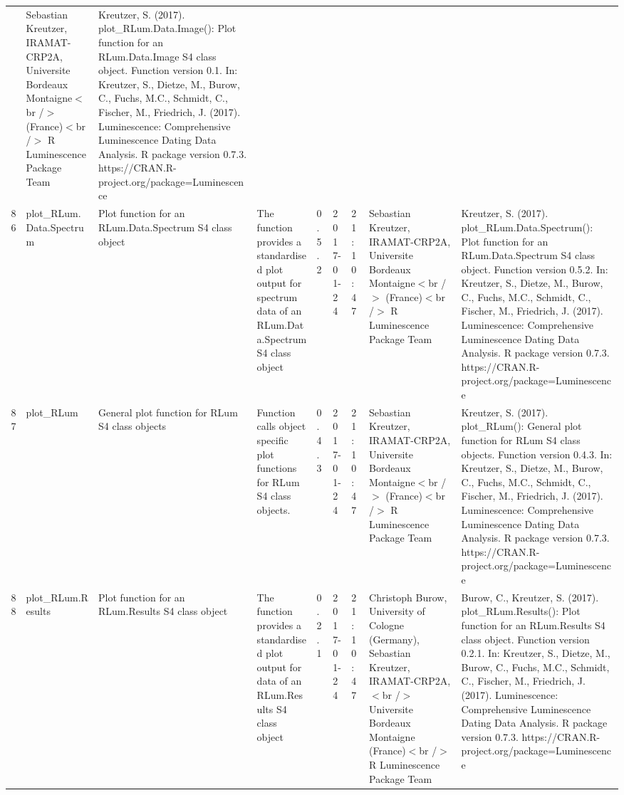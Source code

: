 \begin{table}[ht]
\begin{tabular}{rllllllll}
 & Sebastian Kreutzer, IRAMAT-CRP2A, Universite Bordeaux Montaigne$<$br /$>$ (France)$<$br /$>$  R Luminescence Package Team & Kreutzer, S. (2017). plot\_RLum.Data.Image(): Plot function for an RLum.Data.Image S4 class object. Function version 0.1. In: Kreutzer, S., Dietze, M., Burow, C., Fuchs, M.C., Schmidt, C., Fischer, M., Friedrich, J. (2017). Luminescence: Comprehensive Luminescence Dating Data Analysis. R package version 0.7.3. https://CRAN.R-project.org/package=Luminescence
 \\ 
  86 & plot\_RLum.Data.Spectrum & Plot function for an RLum.Data.Spectrum S4 class object & The function provides a standardised plot output for spectrum data of an RLum.Data.Spectrum S4 class object & 0.5.2 & 2017-01-24 & 21:10:47
 & Sebastian Kreutzer, IRAMAT-CRP2A, Universite Bordeaux Montaigne$<$br /$>$ (France)$<$br /$>$  R Luminescence Package Team & Kreutzer, S. (2017). plot\_RLum.Data.Spectrum(): Plot function for an RLum.Data.Spectrum S4 class object. Function version 0.5.2. In: Kreutzer, S., Dietze, M., Burow, C., Fuchs, M.C., Schmidt, C., Fischer, M., Friedrich, J. (2017). Luminescence: Comprehensive Luminescence Dating Data Analysis. R package version 0.7.3. https://CRAN.R-project.org/package=Luminescence
 \\ 
  87 & plot\_RLum & General plot function for RLum S4 class objects & Function calls object specific plot functions for RLum S4 class objects. & 0.4.3 & 2017-01-24 & 21:10:47
 & Sebastian Kreutzer, IRAMAT-CRP2A, Universite Bordeaux Montaigne$<$br /$>$ (France)$<$br /$>$  R Luminescence Package Team & Kreutzer, S. (2017). plot\_RLum(): General plot function for RLum S4 class objects. Function version 0.4.3. In: Kreutzer, S., Dietze, M., Burow, C., Fuchs, M.C., Schmidt, C., Fischer, M., Friedrich, J. (2017). Luminescence: Comprehensive Luminescence Dating Data Analysis. R package version 0.7.3. https://CRAN.R-project.org/package=Luminescence
 \\ 
  88 & plot\_RLum.Results & Plot function for an RLum.Results S4 class object & The function provides a standardised plot output for data of an RLum.Results S4 class object & 0.2.1 & 2017-01-24 & 21:10:47
 & Christoph Burow, University of Cologne (Germany), Sebastian Kreutzer, IRAMAT-CRP2A,$<$br /$>$ Universite Bordeaux Montaigne (France)$<$br /$>$  R Luminescence Package Team & Burow, C., Kreutzer, S. (2017). plot\_RLum.Results(): Plot function for an RLum.Results S4 class object. Function version 0.2.1. In: Kreutzer, S., Dietze, M., Burow, C., Fuchs, M.C., Schmidt, C., Fischer, M., Friedrich, J. (2017). Luminescence: Comprehensive Luminescence Dating Data Analysis. R package version 0.7.3. https://CRAN.R-project.org/package=Luminescence

\end{tabular}
\end{table}
